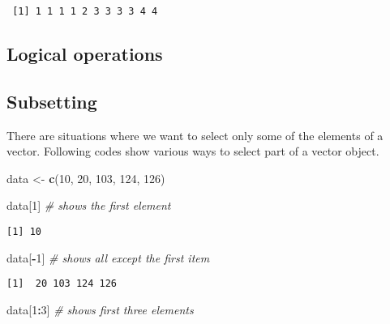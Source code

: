\documentclass[
]{book}
\newenvironment{Shaded}{\begin{snugshade}}{\end{snugshade}}
\newcommand{\CommentTok}[1]{\textcolor[rgb]{0.56,0.35,0.01}{\textit{#1}}}
\newcommand{\DecValTok}[1]{\textcolor[rgb]{0.00,0.00,0.81}{#1}}
\newcommand{\KeywordTok}[1]{\textcolor[rgb]{0.13,0.29,0.53}{\textbf{#1}}}
\newcommand{\NormalTok}[1]{#1}
\newcommand{\OperatorTok}[1]{\textcolor[rgb]{0.81,0.36,0.00}{\textbf{#1}}}
\newcommand{\StringTok}[1]{\textcolor[rgb]{0.31,0.60,0.02}{#1}}
\begin{document}
\begin{verbatim}
 [1] 1 1 1 1 2 3 3 3 3 4 4
\end{verbatim}

\hypertarget{logical-operations}{%
\subsection{Logical operations}\label{logical-operations}}

\hypertarget{subsetting}{%
\subsection{Subsetting}\label{subsetting}}

There are situations where we want to select only some of the elements of a vector. Following codes show various ways to select part of a vector object.

\begin{Shaded}
\begin{Highlighting}[]
\NormalTok{data <-}\StringTok{ }\KeywordTok{c}\NormalTok{(}\DecValTok{10}\NormalTok{, }\DecValTok{20}\NormalTok{, }\DecValTok{103}\NormalTok{, }\DecValTok{124}\NormalTok{, }\DecValTok{126}\NormalTok{)}

\NormalTok{data[}\DecValTok{1}\NormalTok{] }\CommentTok{# shows the first element }
\end{Highlighting}
\end{Shaded}

\begin{verbatim}
[1] 10
\end{verbatim}

\begin{Shaded}
\begin{Highlighting}[]
\NormalTok{data[}\OperatorTok{-}\DecValTok{1}\NormalTok{] }\CommentTok{# shows all except the first item}
\end{Highlighting}
\end{Shaded}

\begin{verbatim}
[1]  20 103 124 126
\end{verbatim}

\begin{Shaded}
\begin{Highlighting}[]
\NormalTok{data[}\DecValTok{1}\OperatorTok{:}\DecValTok{3}\NormalTok{] }\CommentTok{# shows first three elements}
\end{Highlighting}
\end{Shaded}
\end{document}
